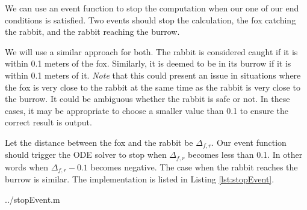 We can use an event function to stop the computation when our one of our end conditions is satisfied. Two events should stop the calculation, the fox catching the rabbit, and the rabbit reaching the burrow.

We will use a similar approach for both. The rabbit is considered caught if it is within 0.1 meters of the fox. Similarly, it is deemed to be in its burrow if it is within 0.1 meters of it. \emph{Note} that this could present an issue in situations where the fox is very close to the rabbit at the same time as the rabbit is very close to the burrow. It could be ambiguous whether the rabbit is safe or not. In these cases, it may be appropriate to choose a smaller value than 0.1 to ensure the correct result is output.

Let the distance between the fox and the rabbit be $\Delta_{f,r}$. Our event function should trigger the ODE solver to stop when $\Delta_{f,r}$ becomes less than 0.1. In other words when $\Delta_{f,r} - 0.1$ becomes negative. The case when the rabbit reaches the burrow is similar. The implementation is listed in Listing \ref{lst:stopEvent}.

  {../stopEvent.m}

